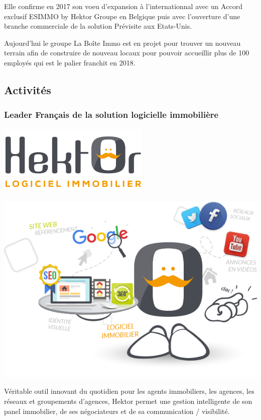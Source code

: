 \documentclass[12pt]{article}
\begin{document}
Elle confirme en 2017 son voeu d'expansion à l'internationnal avec un Accord exclusif ESIMMO by Hektor Groupe en Belgique puis avec l'ouverture d'une branche commerciale de la solution Prévisite aux Etats-Unis.

Aujourd'hui le groupe La Boîte Immo est en projet pour trouver un nouveau terrain afin de construire de nouveau locaux pour pouvoir accueillir plus de 100 employés qui est le palier franchit en 2018. 


\newpage

\subsection{Activités}
\subsubsection{Leader Français de la solution logicielle immobilière}
\vspace{0.5cm}

\begin{center} \includegraphics[scale = 0.5]{hektor.png} \end{center}
\begin{center} \includegraphics[scale = 0.35]{Hektor_grosse_image.png} \end{center}
\vspace{0.5cm}
Véritable outil innovant du quotidien pour les agents immobiliers, les agences, les réseaux et groupements d'agences, Hektor permet une gestion intelligente de son panel immobilier, de ses négociateurs et de sa communication / visibilité.
\end{document}
